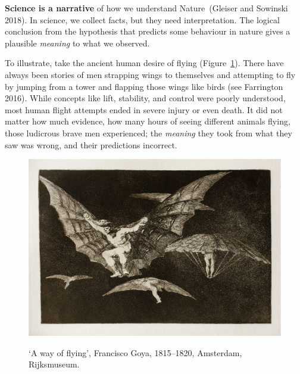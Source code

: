 \documentclass[
  letterpaper,
  12pt,
  british]{tufte-book}
\theoremstyle{plain}
\theoremstyle{definition}
\theoremstyle{plain}
\theoremstyle{remark}
\begin{document}
\textbf{Science is a narrative} of how we understand Nature~(Gleiser and
Sowinski
2018).
In science, we collect facts, but they need interpretation. The logical
conclusion from the hypothesis that predicts some behaviour in nature
gives a plausible \emph{meaning} to what we observed.

To illustrate, take the ancient human desire of flying
(Figure~\ref{fig-goya}). There have always been stories of men strapping
wings to themselves and attempting to fly by jumping from a tower and
flapping those wings like birds (see Farrington
2016).
While concepts like lift, stability, and control were poorly understood,
most human flight attempts ended in severe injury or even death. It did
not matter how much evidence, how many hours of seeing different animals
flying, those ludicrous brave men experienced; the \emph{meaning} they
took from what they saw was wrong, and their predictions incorrect.

\hypertarget{fig-goya}{}
\begin{figure}

\includegraphics{Images/goya.jpg}

\label{fig-goya}`A way of flying', Francisco Goya, 1815--1820,
Amsterdam, Rijksmuseum.

\end{figure}
\end{document}
